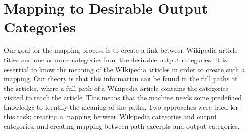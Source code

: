 \section{Mapping to Desirable Output Categories}
Our goal for the mapping process is to create a link between Wikipedia article titles and one or more categories from the desirable output categories. It is essential to know the meaning of the WIkipedia articles in order to create such a mapping. Our theory is that this information can be found in the full paths of the articles, where a 
full path of a Wikipedia article contains the categories visited to reach the article. This means that the  machine needs some predefined knowledge to identify the meaning of the paths. Two approaches were tried for this task; creating a mapping between Wikipedia categories and output categories, and creating mapping between path excerpts and output categories. 





